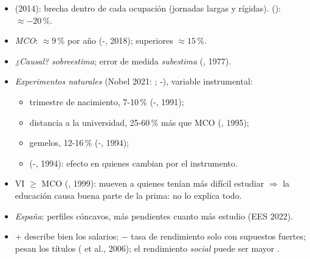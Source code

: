 \documentclass{article}
\begin{document}
\begin{columnas}
\begin{itemize}
\begin{itemize}
  \end{itemize}
\item {} (2014): brecha dentro de cada ocupación (jornadas largas y rígidas).  (): $\approx-20$\,\%.
\end{itemize}
\begin{itemize}
\item \emph{MCO}: $\approx9$\,\% por año (-, 2018); superiores $\approx15$\,\%.
\item \emph{¿Causal?}  \emph{sobreestima}; error de medida \emph{subestima} (, 1977).
\item \emph{Experimentos naturales} (Nobel 2021: ; -), variable instrumental:
  \begin{itemize}
  \item trimestre de nacimiento, 7-10\,\% (-, 1991);
  \item distancia a la universidad, 25-60\,\% más que MCO (, 1995);
  \item gemelos, 12-16\,\% (-, 1994);
  \item {} (-, 1994): efecto en quienes cambian por el instrumento.
  \end{itemize}
\item VI $\geq$ MCO (, 1999): mueven a quienes tenían más difícil estudiar $\Rightarrow$ la educación causa buena parte de la prima:  no lo explica todo.
\item \emph{España}: perfiles cóncavos, más pendientes cuanto más estudio (EES 2022).
\end{itemize}
\begin{itemize}
\item + describe bien los salarios; $-$ tasa de rendimiento solo con supuestos fuertes; pesan los títulos ( et al., 2006); el rendimiento \emph{social} puede ser mayor .
\end{itemize}


\end{columnas}
\end{document}
